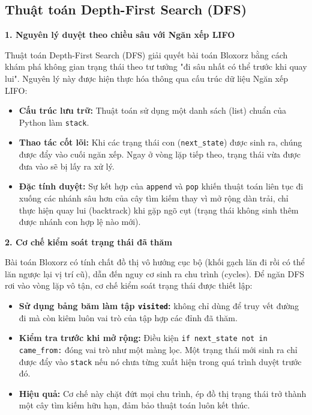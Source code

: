 \documentclass[12pt,a4paper]{article}
\begin{document}
\subsection{Thuật toán Depth-First Search (DFS)}
\textbf{1. Nguyên lý duyệt theo chiều sâu với Ngăn xếp LIFO}

Thuật toán Depth-First Search (DFS) giải quyết bài toán Bloxorz bằng cách khám phá không gian trạng thái theo tư tưởng "đi sâu nhất có thể trước khi quay lui". Nguyên lý này được hiện thực hóa thông qua cấu trúc dữ liệu Ngăn xếp LIFO:

\begin{itemize}
    \item \textbf{Cấu trúc lưu trữ:} Thuật toán sử dụng một danh sách (list) chuẩn của Python làm \texttt{stack}.
    \item \textbf{Thao tác cốt lõi:} Khi các trạng thái con (\texttt{next\_state}) được sinh ra, chúng được đẩy vào cuối ngăn xếp. Ngay ở vòng lặp tiếp theo, trạng thái vừa được đưa vào sẽ bị lấy ra xử lý.
    \item \textbf{Đặc tính duyệt:} Sự kết hợp của \texttt{append} và \texttt{pop} khiến thuật toán liên tục đi xuống các nhánh sâu hơn của cây tìm kiếm thay vì mở rộng dàn trải, chỉ thực hiện quay lui (backtrack) khi gặp ngõ cụt (trạng thái không sinh thêm được nhánh con hợp lệ nào mới).
\end{itemize}

\textbf{2. Cơ chế kiểm soát trạng thái đã thăm}

Bài toán Bloxorz có tính chất đồ thị vô hướng cục bộ (khối gạch lăn đi rồi có thể lăn ngược lại vị trí cũ), dẫn đến nguy cơ sinh ra chu trình (cycles). Để ngăn DFS rơi vào vòng lặp vô tận, cơ chế kiểm soát trạng thái được thiết lập:

\begin{itemize}
    \item \textbf{Sử dụng bảng băm làm tập \texttt{visited}:}  không chỉ dùng để truy vết đường đi mà còn kiêm luôn vai trò của tập hợp các đỉnh đã thăm.
    \item \textbf{Kiểm tra trước khi mở rộng:} Điều kiện \texttt{if next\_state not in came\_from:} đóng vai trò như một màng lọc. Một trạng thái mới sinh ra chỉ được đẩy vào \texttt{stack} nếu nó chưa từng xuất hiện trong quá trình duyệt trước đó.
    \item \textbf{Hiệu quả:} Cơ chế này chặt đứt mọi chu trình, ép đồ thị trạng thái trở thành một cây tìm kiếm hữu hạn, đảm bảo thuật toán luôn kết thúc.
\end{itemize}
\end{document}
